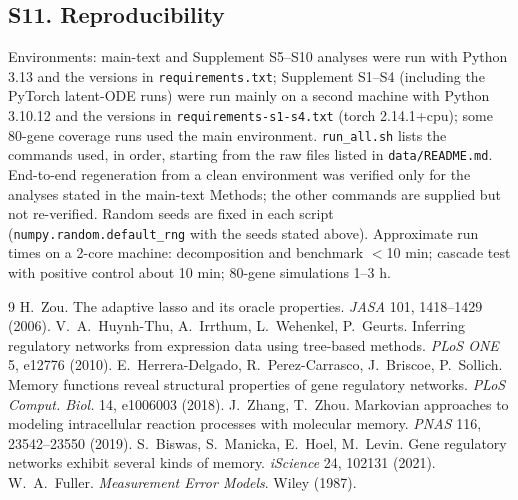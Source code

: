 \documentclass[10pt]{article}
\begin{document}
\subsection*{S11. Reproducibility}
Environments: main-text and Supplement S5--S10 analyses were run with Python 3.13 and the versions in \texttt{requirements.txt}; Supplement S1--S4 (including the PyTorch latent-ODE runs) were run mainly on a second machine with Python 3.10.12 and the versions in \texttt{requirements-s1-s4.txt} (torch 2.14.1+cpu); some 80-gene coverage runs used the main environment. \texttt{run\_all.sh} lists the commands used, in order, starting from the raw files listed in \texttt{data/README.md}. End-to-end regeneration from a clean environment was verified only for the analyses stated in the main-text Methods; the other commands are supplied but not re-verified. Random seeds are fixed in each script (\texttt{numpy.random.default\_rng} with the seeds stated above). Approximate run times on a 2-core machine: decomposition and benchmark $<$10 min; cascade test with positive control about 10 min; 80-gene simulations 1--3 h.

\begin{thebibliography}{9}\small
{} H.~Zou. The adaptive lasso and its oracle properties. \emph{JASA} 101, 1418--1429 (2006).
 V.~A.~Huynh-Thu, A.~Irrthum, L.~Wehenkel, P.~Geurts. Inferring regulatory networks from expression data using tree-based methods. \emph{PLoS ONE} 5, e12776 (2010).
 E.~Herrera-Delgado, R.~Perez-Carrasco, J.~Briscoe, P.~Sollich. Memory functions reveal structural properties of gene regulatory networks. \emph{PLoS Comput. Biol.} 14, e1006003 (2018).
 J.~Zhang, T.~Zhou. Markovian approaches to modeling intracellular reaction processes with molecular memory. \emph{PNAS} 116, 23542--23550 (2019).
 S.~Biswas, S.~Manicka, E.~Hoel, M.~Levin. Gene regulatory networks exhibit several kinds of memory. \emph{iScience} 24, 102131 (2021).
 W.~A.~Fuller. \emph{Measurement Error Models}. Wiley (1987).
\end{thebibliography}
\end{document}
